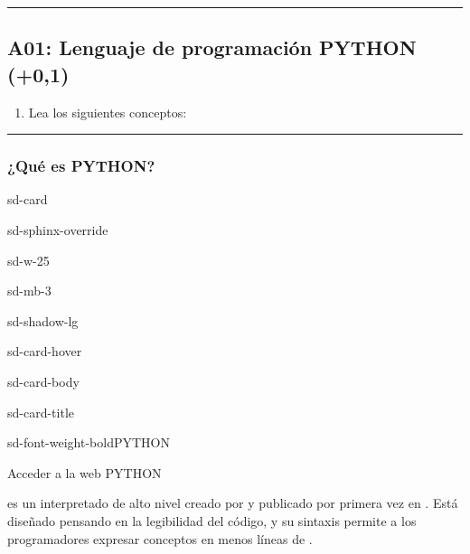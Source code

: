 \documentclass[letterpaper,10pt,spanish]{sphinxmanual}
\begin{document}
\bigskip\hrule\bigskip



\subsection{A01: Lenguaje de programación PYTHON (+0,1)}
\label{\detokenize{1_guias/10programacion/G1024:a01-lenguaje-de-programacion-python-0-1}}
\sphinxAtStartPar
{}
\begin{enumerate}
%
\item {} 
\sphinxAtStartPar
Lea los siguientes conceptos:

\end{enumerate}


\bigskip\hrule\bigskip



\subsubsection{¿Qué es PYTHON?}
\label{\detokenize{1_guias/10programacion/G1024:que-es-python}}
\begin{sphinxuseclass}{sd-card}
\begin{sphinxuseclass}{sd-sphinx-override}
\begin{sphinxuseclass}{sd-w-25}
\begin{sphinxuseclass}{sd-mb-3}
\begin{sphinxuseclass}{sd-shadow-lg}
\begin{sphinxuseclass}{sd-card-hover}
\noindent{}

\begin{sphinxuseclass}{sd-card-body}
\begin{sphinxuseclass}{sd-card-title}
\begin{sphinxuseclass}{sd-font-weight-bold}PYTHON
\end{sphinxuseclass}
\end{sphinxuseclass}
\sphinxAtStartPar
Acceder a la web PYTHON

\end{sphinxuseclass}
\end{sphinxuseclass}
\end{sphinxuseclass}
\end{sphinxuseclass}
\end{sphinxuseclass}
\end{sphinxuseclass}
\end{sphinxuseclass}
\sphinxAtStartPar
{} es un  interpretado de alto nivel creado por  y publicado por primera vez en . Está diseñado pensando en la legibilidad del código, y su sintaxis permite a los programadores expresar conceptos en menos líneas de .
\end{document}
